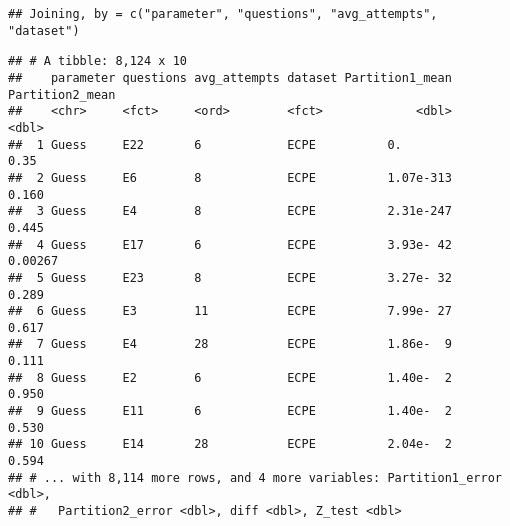 \documentclass[]{article}
\newenvironment{Shaded}{\begin{snugshade}}{\end{snugshade}}
\newcommand{\CommentTok}[1]{\textcolor[rgb]{0.56,0.35,0.01}{\textit{#1}}}
\newcommand{\DataTypeTok}[1]{\textcolor[rgb]{0.13,0.29,0.53}{#1}}
\newcommand{\KeywordTok}[1]{\textcolor[rgb]{0.13,0.29,0.53}{\textbf{#1}}}
\newcommand{\NormalTok}[1]{#1}
\newcommand{\OperatorTok}[1]{\textcolor[rgb]{0.81,0.36,0.00}{\textbf{#1}}}
\newcommand{\OtherTok}[1]{\textcolor[rgb]{0.56,0.35,0.01}{#1}}
\newcommand{\StringTok}[1]{\textcolor[rgb]{0.31,0.60,0.02}{#1}}
\begin{document}
\begin{Shaded}
\begin{Highlighting}[]
{{{{{{\NormalTok{                                                                     ) }\OperatorTok{%>%}\StringTok{ }
\StringTok{  }
\StringTok{  }\CommentTok{#filter(Z_test > -250 & Z_test < 250) %>%}
\StringTok{  }\KeywordTok{group_by}\NormalTok{(dataset,parameter,avg_attempts) }\OperatorTok{%>%}\StringTok{ }\KeywordTok{mutate}\NormalTok{(}\DataTypeTok{Z_avg =} \KeywordTok{mean}\NormalTok{(Z_test, }\DataTypeTok{na.rm =} \OtherTok{TRUE}\NormalTok{)) }\OperatorTok{%>%}\StringTok{ }\KeywordTok{ungroup}\NormalTok{()}
\end{Highlighting}
\end{Shaded}

\begin{verbatim}
## Joining, by = c("parameter", "questions", "avg_attempts", "dataset")
\end{verbatim}

\begin{Shaded}
\end{Shaded}

\begin{verbatim}
## # A tibble: 8,124 x 10
##    parameter questions avg_attempts dataset Partition1_mean Partition2_mean
##    <chr>     <fct>     <ord>        <fct>             <dbl>           <dbl>
##  1 Guess     E22       6            ECPE          0.                0.35   
##  2 Guess     E6        8            ECPE          1.07e-313         0.160  
##  3 Guess     E4        8            ECPE          2.31e-247         0.445  
##  4 Guess     E17       6            ECPE          3.93e- 42         0.00267
##  5 Guess     E23       8            ECPE          3.27e- 32         0.289  
##  6 Guess     E3        11           ECPE          7.99e- 27         0.617  
##  7 Guess     E4        28           ECPE          1.86e-  9         0.111  
##  8 Guess     E2        6            ECPE          1.40e-  2         0.950  
##  9 Guess     E11       6            ECPE          1.40e-  2         0.530  
## 10 Guess     E14       28           ECPE          2.04e-  2         0.594  
## # ... with 8,114 more rows, and 4 more variables: Partition1_error <dbl>,
## #   Partition2_error <dbl>, diff <dbl>, Z_test <dbl>
\end{verbatim}
\end{document}
